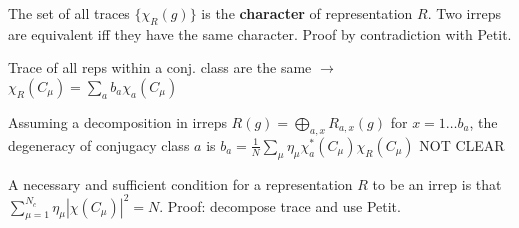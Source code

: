 \begin{squishlist}
    \item The set of all traces $\{\chi_R(g)\}$ is the \textbf{character} of representation $R$. Two irreps are equivalent iff they have the same character.
    Proof by contradiction with Petit.

    \item Trace of all reps within a conj. class are the same $\rightarrow$ $\chi_R(C_{\mu}) = \sum_a b_a \chi_a ( C_{\mu})$
    \item Assuming a decomposition in irreps $R(g) = \bigoplus_{a,x}R_{a,x}(g)$ for $x = 1 \ldots b_a$, the degeneracy of conjugacy class $a$ is $b_a = \frac{1}{N} \sum_{\mu} \eta_{\mu} \chi^*_a(C_{\mu})\chi_R(C_{\mu})$ NOT CLEAR
    
    \item A necessary and sufficient condition for a representation $R$ to be an irrep is that \\
    $\sum_{\mu = 1}^{N_c} \eta_{\mu} |\chi(C_{\mu})|^2 = N$. Proof: decompose trace and use Petit.
\end{squishlist}


